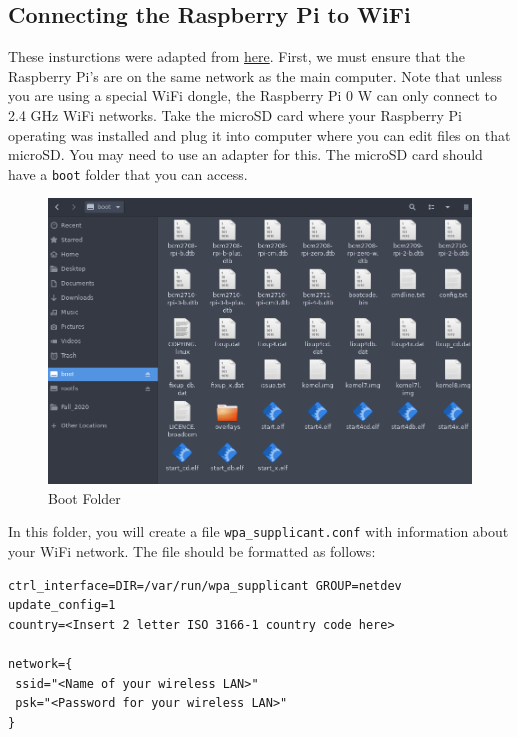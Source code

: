 \documentclass[11pt]{article}
\begin{document}
\subsection{Connecting the Raspberry Pi to WiFi}
These insturctions were adapted from \href{https://www.raspberrypi.org/documentation/configuration/wireless/headless.md}{here}.
\vspace{2mm}
\newline
First, we must ensure that the Raspberry Pi's are on the same network as the main computer. Note that unless you are using a special WiFi dongle, the Raspberry Pi 0 W can only connect to 2.4 GHz WiFi networks. Take the microSD card where your Raspberry Pi operating was installed and plug it into computer where you can edit files on that microSD. You may need to use an adapter for this. The microSD card should have a \verb|boot| folder that you can access.
\begin{figure}[h]
    \centering
    \includegraphics[width=\textwidth]{images/boot.png}
    \caption{Boot Folder}
\end{figure}
\vspace{2mm}
\newline
In this folder, you will create a file \verb|wpa_supplicant.conf| with information about your WiFi network. The file should be formatted as follows:

\begin{verbatim}
ctrl_interface=DIR=/var/run/wpa_supplicant GROUP=netdev
update_config=1
country=<Insert 2 letter ISO 3166-1 country code here>

network={
 ssid="<Name of your wireless LAN>"
 psk="<Password for your wireless LAN>"
}
\end{verbatim}
\end{document}

